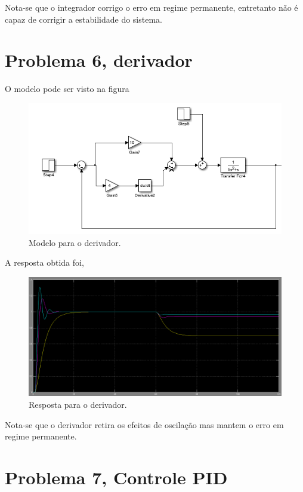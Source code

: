 \documentclass[a4paper, 10pt]{article}
\begin{document}
Nota-se que o integrador corrigo o erro em regime permanente, entretanto
não é capaz de corrigir a estabilidade do sistema.

\section{Problema 6, derivador}

O modelo pode ser visto na figura

\begin{figure}[!ht]
	\centering
	\includegraphics[scale=.5]{mq6.png}
    \caption{Modelo para o derivador.}
    \label{fig:modProb6}
\end{figure}

A resposta obtida foi,

\begin{figure}[!ht]
	\centering
	\includegraphics[scale=.3]{rq6.png}
    \caption{Resposta para o derivador.}
    \label{fig:resProb6}
\end{figure}

Nota-se que o derivador retira os efeitos de oscilação mas mantem 
o erro em regime permanente.

\section{Problema 7, Controle PID}
\end{document}
